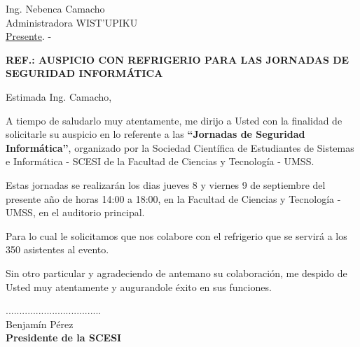 \documentclass[letterpaper,12pt]{letter}
\begin{document}
\date {18 de agosto de 2011}

\begin{letter}{Ing. Nebenca Camacho \\ Administradora WIST'UPIKU\\\underline {Presente}. -}

\begin{center}
	\opening{\textbf{REF.: AUSPICIO CON REFRIGERIO PARA LAS JORNADAS DE SEGURIDAD INFORM\'ATICA}}
\end{center}

Estimada Ing. Camacho,

A tiempo de saludarlo muy atentamente, me dirijo a Usted con la finalidad de solicitarle su auspicio en lo referente 
a las {\bfseries ``Jornadas de Seguridad Inform\'atica''}, organizado por la Sociedad Cient\'ifica de Estudiantes de 
Sistemas e Inform\'atica - SCESI de la Facultad de Ciencias y Tecnolog\'ia - UMSS.

Estas jornadas se realizar\'an los dias jueves 8 y viernes 9 de septiembre del presente a\~no de horas 14:00 a 
18:00, en la Facultad de Ciencias y Tecnolog\'ia - UMSS, en el auditorio principal.

Para lo cual le solicitamos que nos colabore con el refrigerio que se servir\'a a los 350 asistentes al evento.

Sin otro particular y agradeciendo de antemano su colaboraci\'on, me despido de Usted muy atentamente y augurandole \'exito en sus funciones.\\

\vspace{2cm}

\begin{center}
...................................\\
Benjam\'in P\'erez\\
{\bfseries Presidente de la  SCESI}
\end{center}

\end{letter}
\end{document}
